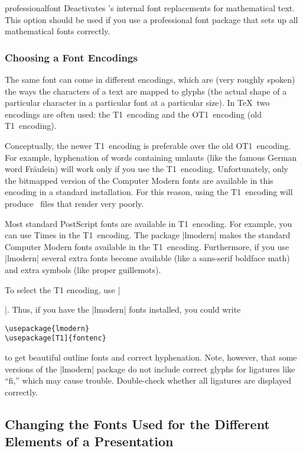 \begin{classoption}{professionalfont}
  Deactivates \beamer's internal font replacements for mathematical
  text. This option should be used if you use a professional font
  package that sets up all mathematical fonts correctly.
\end{classoption}



\subsubsection{Choosing a Font Encodings}
\label{section-font-encoding}

The same font can come in different encodings, which are (very roughly
spoken) the ways the characters of a text are mapped to glyphs (the
actual shape of a particular character in a particular font at a
particular size). In \TeX\ two encodings are often used: the
T1~encoding and the OT1~encoding (old T1~encoding).

Conceptually, the newer T1~encoding is preferable over the old
OT1~encoding. For example, hyphenation of words containing umlauts
(like the famous German word Fr\"aulein) will work only if you use the
T1~encoding. Unfortunately, only the bitmapped version of the Computer
Modern fonts are available in this encoding in a standard
installation. For this reason, using the T1~encoding will produce
\pdf\ files that render very poorly.

Most standard PostScript fonts are available in T1~encoding. For
example, you can use Times in the T1~encoding. The package |lmodern|
makes the standard Computer Modern fonts available in the
T1~encoding. Furthermore, if you use |lmodern| several extra fonts
become available (like a sans-serif boldface math) and extra symbols
(like proper guillemots).

To select the T1 encoding, use |\usepackage[T1]{fontenc}|. Thus, if
you have the |lmodern| fonts installed, you could write
\begin{verbatim}
\usepackage{lmodern}
\usepackage[T1]{fontenc}
\end{verbatim}
to get beautiful outline fonts and correct hyphenation. Note, however,
that some versions of the |lmodern| package do not include correct
glyphs for ligatures like ``fi,'' which may cause
trouble. Double-check whether all ligatures are displayed correctly.





\subsection{Changing the Fonts Used for the Different Elements of a Presentation}




